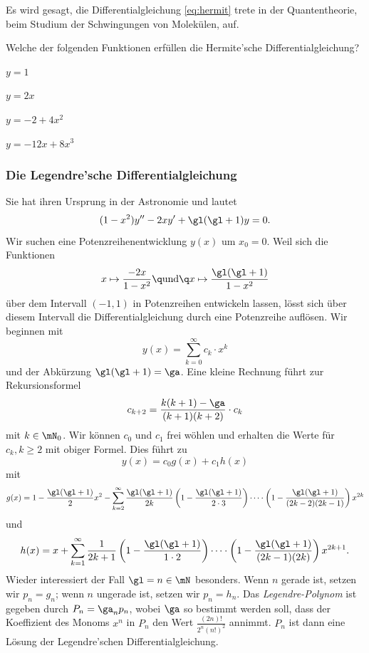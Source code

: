 \documentclass[%
draft,
11pt,%
twoside,%
titlepage,%
german,%
headsepline%
]{scrartcl}
\begin{document}
\begin{bem}
Es wird gesagt, die Differentialgleichung \eqref{eq:hermit} trete in der Quantentheorie, beim Studium der Schwingungen von Molek\"ulen, auf.
\end{bem}

\begin{ueb}
Welche der folgenden Funktionen erf\"ullen die Hermite'sche Differentialgleichung?

\begin{minipage}{0.3\textwidth}
\begin{enumeratea}
\item $y=1$
\item $y=2x$
\end{enumeratea}
\end{minipage}
\begin{minipage}{0.4\textwidth}
\begin{enumeratea}
\setcounter{enumi}{2}
\item $y=-2+4x^2$
\item $y=-12x+8x^3$
\end{enumeratea}
\end{minipage}
\end{ueb}

\subsubsection{Die Legendre'sche Differentialgleichung}

Sie hat ihren Ursprung in der Astronomie und lautet
\begin{equation}\label{eq:legendre}
(1-x^2)y''-2xy'+\gl(\gl+1)y=0.
\end{equation}
Wir suchen eine Potenzreihenentwicklung $y(x)$ um $x_0=0$. Weil sich die Funktionen
$$x\mapsto\frac{-2x}{1-x^2}\q\text{und}\q x\mapsto\frac{\gl(\gl+1)}{1-x^2}$$
\"uber dem Intervall $(-1,1)$ in Potenzreihen entwickeln lassen, l\"osst sich \"uber diesem Intervall die Differentialgleichung durch eine Potenzreihe aufl\"osen.
Wir beginnen mit
$$y(x)=\sum_{k=0}^\infty c_k\cdot x^k$$
und der Abk\"urzung $\gl(\gl+1)=\ga$. Eine kleine Rechnung f\"uhrt zur Rekursionsformel
$$c_{k+2}=\frac{k(k+1)-\ga}{(k+1)(k+2)}\cdot c_k$$
mit $k\in\mN_0$. Wir k\"onnen $c_0$ und $c_1$ frei w\"ohlen und erhalten die Werte f\"ur $c_k, k\geq2$ mit obiger Formel. Dies f\"uhrt zu
$$y(x)=c_0g(x)+c_1h(x)$$
mit
$$
g(x)=1-\frac{\gl(\gl+1)}{2}x^2
-\sum_{k=2}^\infty\frac{\gl(\gl+1)}{2k}\left(1-\frac{\gl(\gl+1)}{2\cdot3}\right)
\dots \cdot \left(1-\frac{\gl(\gl+1)}{(2k-2)(2k-1)}\right) x^{2k}
$$
und
$$
h(x)=x
+\sum_{k=1}^\infty\frac{1}{2k+1}\left(1-\frac{\gl(\gl+1)}{1\cdot2}\right)
\dots\cdot \left(1-\frac{\gl(\gl+1)}{(2k-1)(2k)}\right) x^{2k+1}.
$$
Wieder interessiert der Fall $\gl=n\in\mN$ besonders. Wenn $n$ gerade ist, setzen wir $p_n=g_n$; wenn $n$ ungerade ist, setzen wir $p_n=h_n$. Das \emph{Legendre-Polynom} ist gegeben durch $P_n=\ga_np_n$, wobei $\ga$ so bestimmt werden soll, dass der Koeffizient des Monoms $x^n$ in $P_n$ den Wert $\frac{(2n)!}{2^n(n!)^2}$ annimmt. $P_n$ ist dann eine L\"osung der Legendre'schen Differentialgleichung.
\end{document}
